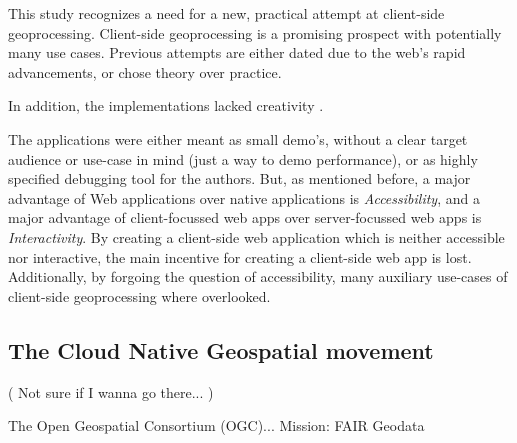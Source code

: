 This study recognizes a need for a new, practical attempt at client-side geoprocessing. 
Client-side geoprocessing is a promising prospect with potentially many use cases.
Previous attempts are either dated due to the web's rapid advancements, or chose theory over practice.

In addition, the implementations lacked creativity . 

The applications were either meant as small demo's, without a clear target audience or use-case in mind (just a way to demo performance), or as highly specified debugging tool for the authors.   
But, as mentioned before, a major advantage of Web applications over native applications is \emph{Accessibility}, and a major advantage of client-focussed web apps over server-focussed web apps is \emph{Interactivity}. 
By creating a client-side web application which is neither accessible nor interactive, the main incentive for creating a client-side web app is lost.
Additionally, by forgoing the question of accessibility, many auxiliary use-cases of client-side geoprocessing where overlooked.


\subsection*{The Cloud Native Geospatial movement}

( Not sure if I wanna go there... )

The Open Geospatial Consortium (OGC)...
Mission: FAIR Geodata 

